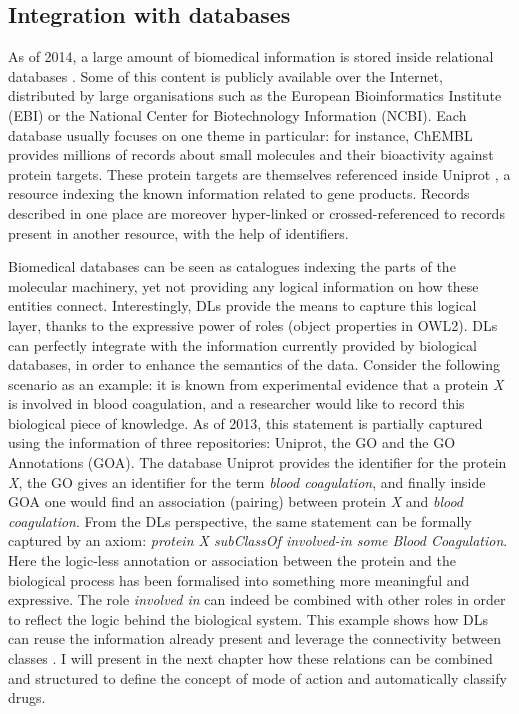 \subsection{Integration with databases}

As of 2014, a large amount of biomedical information is stored inside relational databases \citep{brooksbank2014european}. Some of this content is publicly available over the Internet, distributed by large organisations such as the European Bioinformatics Institute (EBI) or the National Center for Biotechnology Information (NCBI). Each database usually focuses on one theme in particular: for instance, ChEMBL \citep{gaulton2012chembl} provides millions of records about small molecules and their bioactivity against protein targets. These protein targets are themselves referenced inside Uniprot \citep{uniprot2013update}, a resource indexing the known information related to gene products. Records described in one place are moreover hyper-linked or crossed-referenced to records present in another resource, with the help of identifiers.

Biomedical databases can be seen as catalogues indexing the parts of the molecular machinery, yet not providing any logical information on how these entities connect. Interestingly, DLs provide the means to capture this logical layer, thanks to the expressive power of roles (object properties in OWL2). DLs can perfectly integrate with the information currently provided by biological databases, in order to enhance the semantics of the data. Consider the following scenario as an example: it is known from experimental evidence that a protein \emph{X} is involved in blood coagulation, and a researcher would like to record this biological piece of knowledge. As of 2013, this statement is partially captured using the information of three repositories: Uniprot, the GO and the GO Annotations (GOA). The database Uniprot provides the identifier for the protein \emph{X}, the GO gives an identifier for the term \emph{blood coagulation}, and finally inside GOA one would find an association (pairing) between protein \emph{X} and \emph{blood coagulation}. From the DLs perspective, the same statement can be formally captured by an axiom: \emph{protein X subClassOf involved-in some Blood Coagulation}. Here the logic-less annotation or association between the protein and the biological process has been formalised into something more meaningful and expressive. The role \emph{involved in} can indeed be combined with other roles in order to reflect the logic behind the biological system. This example shows how DLs can reuse the information already present and leverage the connectivity between classes \citep{jupp2012logical}. I will present in the next chapter how these relations can be combined and structured to define the concept of mode of action and automatically classify drugs.

